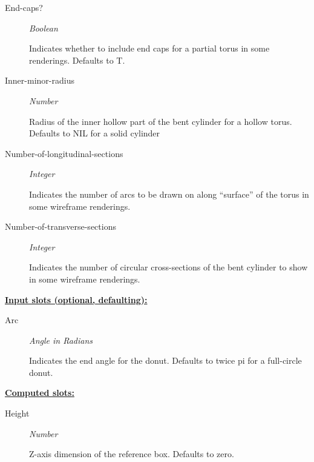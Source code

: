 \documentclass [11pt]{book}
\begin{document}
\begin{itemize}
\begin{description}
\item [End-caps?]
\emph{Boolean}

 Indicates whether to include end caps for a partial torus in some renderings. Defaults to T.




\item [Inner-minor-radius]
\emph{Number}

 Radius of the inner hollow part of the bent cylinder for a hollow torus. Defaults to NIL for a solid cylinder




\item [Number-of-longitudinal-sections]
\emph{Integer}

 Indicates the number of arcs to be drawn on along ``surface'' of the torus in some wireframe renderings.




\item [Number-of-transverse-sections]
\emph{Integer}

 Indicates the number of circular cross-sections of the bent cylinder to show in some wireframe renderings.




\end{description}






\textbf{
\underline{Input slots (optional, defaulting):}}

\begin{description}

\item [Arc]
\emph{Angle in Radians}

 Indicates the end angle for the donut. Defaults to twice pi for a full-circle donut.




\end{description}






\textbf{
\underline{Computed slots:}}

\begin{description}

\item [Height]
\emph{Number}

 Z-axis dimension of the reference box. Defaults to zero.





\end{description}
\end{itemize}
\end{document}
